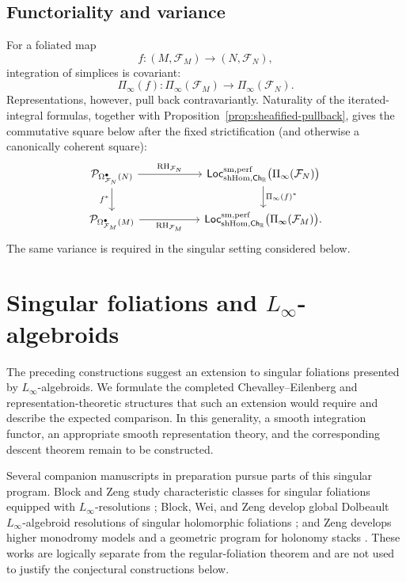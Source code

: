 \documentclass[12pt]{amsart}
\theoremstyle{definition}
\theoremstyle{remark}
\numberwithin{equation}{section}
\newcommand{\CF}{{\mathcal F}}
\newcommand{\R}{{\mathbb{R}}}
\newcommand{\1}{{\mathbb{1}}}
\newcommand{\Ch}{\mathsf{Ch}}
\newcommand{\Loc}{\mathsf{Loc}}
\newcommand{\RH}{\operatorname{RH}}
\begin{document}
\subsection{Functoriality and variance}

For a foliated map
\[
 f:(M,\CF_M)\longrightarrow(N,\CF_N),
\]
integration of simplices is covariant:
\[
 \Pi_\infty(f):
 \Pi_\infty(\CF_M)\longrightarrow\Pi_\infty(\CF_N).
\]
Representations, however, pull back contravariantly.  Naturality of
the iterated-integral formulas, together with
Proposition~\ref{prop:sheafified-pullback}, gives the commutative
square below after the fixed strictification (and otherwise a
canonically coherent square):
\[
\begin{tikzcd}[column sep=5.5em]
\mathcal P_{\Omega^\bullet_{\CF_N}(N)}
 \arrow[r,"\RH_{\CF_N}"]
 \arrow[d,"f^*"']
&
\Loc_{\mathrm{shHom},\Ch_{\R}}^{\mathrm{sm,perf}}
 \bigl(\Pi_\infty(\CF_N)\bigr)
 \arrow[d,"\Pi_\infty(f)^*"]
\\
\mathcal P_{\Omega^\bullet_{\CF_M}(M)}
 \arrow[r,"\RH_{\CF_M}"']
&
\Loc_{\mathrm{shHom},\Ch_{\R}}^{\mathrm{sm,perf}}
 \bigl(\Pi_\infty(\CF_M)\bigr).
\end{tikzcd}
\]
The same variance is required in the singular setting considered
below.

\section{Singular foliations and
$L_\infty$-algebroids}\label{sec:singular-outlook}

The preceding constructions suggest an extension to singular
foliations presented by $L_\infty$-algebroids.  We formulate the
completed Chevalley--Eilenberg and representation-theoretic structures
that such an extension would require and describe the expected
comparison.  In this generality, a smooth integration functor, an
appropriate smooth representation theory, and the corresponding
descent theorem remain to be constructed.

Several companion manuscripts in preparation pursue parts of this
singular program.  Block and Zeng study characteristic classes for
singular foliations equipped with $L_\infty$-resolutions
\cite{BlockZengSingularClassesPrep}; Block, Wei, and Zeng develop
global Dolbeault $L_\infty$-algebroid resolutions of singular
holomorphic foliations \cite{BlockWeiZengDolbeaultPrep}; and Zeng
develops higher monodromy models and a geometric program for holonomy
stacks \cite{ZengHigherMonodromyPrep,ZengHolonomyStacksPrep}.  These
works are logically separate from the regular-foliation theorem and
are not used to justify the conjectural constructions below.
\end{document}
